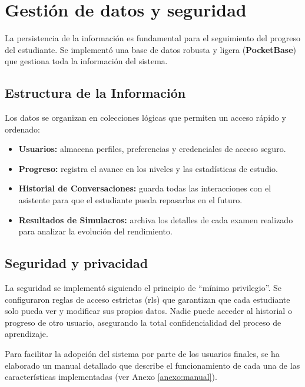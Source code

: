 \section{Gestión de datos y seguridad}

La persistencia de la información es fundamental para el seguimiento del progreso del estudiante. Se implementó una base de datos robusta y ligera (\textbf{PocketBase}) que gestiona toda la información del sistema.

\subsection{Estructura de la Información}
Los datos se organizan en colecciones lógicas que permiten un acceso rápido y ordenado:
\begin{itemize}
\item \textbf{Usuarios:} almacena perfiles, preferencias y credenciales de acceso seguro.
\item \textbf{Progreso:} registra el avance en los niveles y las estadísticas de estudio.
\item \textbf{Historial de Conversaciones:} guarda todas las interacciones con el asistente para que el estudiante pueda repasarlas en el futuro.
\item \textbf{Resultados de Simulacros:} archiva los detalles de cada examen realizado para analizar la evolución del rendimiento.
\end{itemize}

\subsection{Seguridad y privacidad}
La seguridad se implementó siguiendo el principio de \enquote{mínimo privilegio}. Se configuraron reglas de acceso estrictas (\gls{rls}) que garantizan que cada estudiante solo pueda ver y modificar sus propios datos. Nadie puede acceder al historial o progreso de otro usuario, asegurando la total confidencialidad del proceso de aprendizaje.

Para facilitar la adopción del sistema por parte de los usuarios finales, se ha elaborado un manual detallado que describe el funcionamiento de cada una de las características implementadas (ver Anexo \ref{anexo:manual}).

